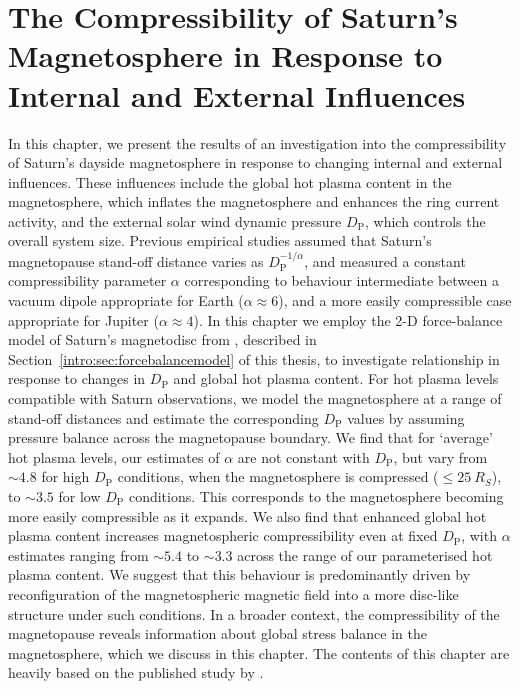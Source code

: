 \chapter[The Compressibility of Saturn's Magnetosphere]{The Compressibility of Saturn's Magnetosphere in Response to Internal and External Influences}
\label{chap:compress}

In this chapter, we present the results  of an investigation into the compressibility of Saturn's dayside magnetosphere in response to changing internal  and external influences. These influences include the global hot plasma content in the magnetosphere, which inflates the magnetosphere and  enhances the ring current activity, and the external solar wind dynamic pressure $D_\mathrm{P}$, which controls the overall system size. Previous empirical studies assumed that Saturn's magnetopause stand-off distance varies as $D_\mathrm{P}^{-1/\alpha}$, and measured a constant compressibility parameter $\alpha$ corresponding to behaviour intermediate between a vacuum dipole appropriate for Earth ($\alpha \approx 6$), and a more easily compressible case appropriate for Jupiter ($\alpha \approx 4$). In this chapter we employ the 2-D force-balance model of Saturn's magnetodisc from \citet{achilleos2010a}, described in Section~\ref{intro:sec:forcebalancemodel} of this thesis, to investigate relationship in response to changes in $D_\mathrm{P}$ and global hot plasma content. For hot plasma levels compatible with Saturn observations, we model the magnetosphere at a range of stand-off distances and estimate the corresponding $D_\mathrm{P}$ values by assuming pressure balance across the magnetopause boundary. We find that for `average' hot plasma levels, our estimates of $\alpha$ are not constant with $D_\mathrm{P}$, but vary from ${\sim}4.8$ for high $D_\mathrm{P}$ conditions, when the magnetosphere is compressed (${\leq}\SI{25}{R_S}$), to ${\sim}3.5$ for low $D_\mathrm{P}$ conditions. This corresponds to the magnetosphere becoming more easily compressible as it expands. We also find that enhanced global hot plasma content increases magnetospheric compressibility even at fixed $D_\mathrm{P}$, with $\alpha$ estimates ranging from ${\sim}5.4$ to ${\sim}3.3$ across the range of our parameterised hot plasma content. We suggest that this behaviour is predominantly driven by reconfiguration of the magnetospheric magnetic field into a more disc-like structure under such conditions. In a broader context, the compressibility of the magnetopause reveals information about global stress balance in the magnetosphere, which we discuss in this chapter. The contents of this chapter are heavily based on the published study by \citet{sorba2017}.

